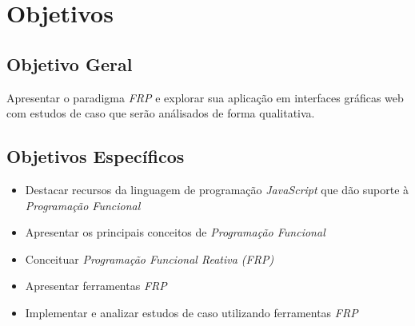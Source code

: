 \section{Objetivos}\label{lobjetivos}

\subsection{Objetivo Geral}
Apresentar o paradigma \emph{FRP} e explorar sua aplicação
em interfaces gráficas web com estudos de caso que serão
análisados de forma qualitativa.

\subsection{Objetivos Específicos}
\begin{itemize}[noitemsep]
  \item Destacar recursos da linguagem de programação
        \emph{JavaScript} que dão suporte à
        \emph{Programação Funcional}
  \item Apresentar os principais conceitos de \emph{Programação Funcional}
  \item Conceituar \emph{Programação Funcional Reativa (FRP)}
  \item Apresentar ferramentas \emph{FRP}
  \item Implementar e analizar estudos de caso utilizando ferramentas \emph{FRP}
\end{itemize}
